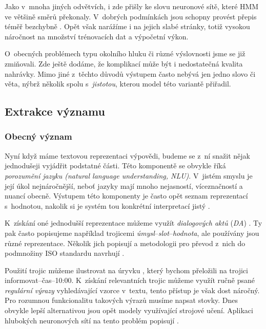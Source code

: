 Jako v~mnoha jiných odvětvích, i zde přišly ke slovu neuronové sítě, které HMM
ve většině směrů překonaly. V~dobrých podmínkách jsou schopny provést přepis
téměř bezchybně \citep{zhang_pushing_2020}. Opět však narážíme i na jejich slabé stránky,
totiž vysokou náročnost na množství trénovacích dat a výpočetní výkon.

O~obecných problémech typu okolního hluku či různé výslovnosti jsme se
již zmiňovali. Zde ještě dodáme, že komplikací může být i nedostatečná kvalita
nahrávky. Mimo jiné z~těchto důvodů výstupem často nebývá jen jedno
slovo či věta, nýbrž několik spolu s~\textit{jistotou}, kterou model této
variantě přiřadil.

\subsection{Extrakce významu}\label{nlu}

\subsubsection{Obecný význam}
Nyní když máme textovou reprezentaci výpovědi, budeme se z~ní snažit nějak
jednodušeji vyjádřit podstatné části. Této komponentě se obvykle říká
\textit{porozumění jazyku (natural language understanding, NLU)}. V~jistém
smyslu je její úkol nejnáročnější, neboť jazyky mají mnoho nejasností,
víceznačností a nuancí obecně. Výstupem této komponenty je často opět
seznam reprezentací s~hodnotou, nakolik si je systém tou konkrétní
interpretací jistý \citep[sekce 4.3]{gao_neural_2019}.

K~získání oné jednodušší reprezentace můžeme využít \textit{dialogových aktů}
(\textit{DA}) \citep[strana 494]{jurafsky_slp_2020}. Ty pak
často popisujeme například trojicemi \textit{úmysl}--\textit{slot}--\textit{hodnota},
ale používány jsou různé reprezentace. Několik jich popisují a
metodologii pro převod z~nich do podmnožiny
ISO standardu navrhují \citet{mezza_iso-standard_2018}.

Použití trojic můžeme ilustrovat na úryvku , který bychom
přeložili na trojici
informovat--čas--10:00. K~získání relevantních trojic můžeme využít ručně
psané \textit{regulární výrazy} vyhledávající vzorce v~textu, tento přístup
je však dost náročný. Pro rozumnou funkcionalitu takových výrazů musíme napsat
stovky. Dnes obvykle lepší alternativou jsou opět modely využívající strojové
učení. Aplikaci hlubokých neuronových sítí na tento problém
popisují \citet{liu_multi-task_2019}.


